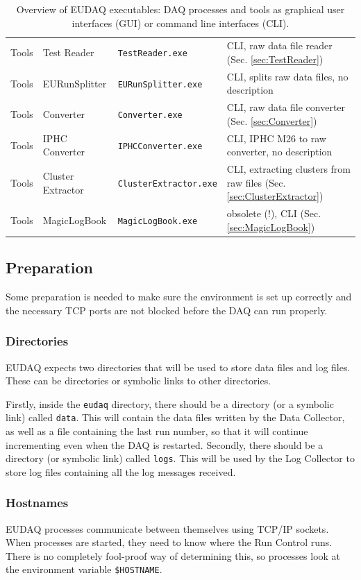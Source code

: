 \begin{table}
\begin{tabular}{ c | l | l | p{4cm}}
  Tools & Test Reader & \texttt{TestReader.exe} & CLI, raw data file reader (Sec. \ref{sec:TestReader}) \\
  Tools & EURunSplitter & \texttt{EURunSplitter.exe} & CLI, splits raw data files, no description \\
  Tools & Converter & \texttt{Converter.exe} & CLI, raw data file converter (Sec. \ref{sec:Converter}) \\
  Tools & IPHC Converter & \texttt{IPHCConverter.exe} & CLI, IPHC M26 to raw converter, no description \\
  Tools & Cluster Extractor & \texttt{ClusterExtractor.exe} & CLI, extracting clusters from raw files  (Sec. \ref{sec:ClusterExtractor}) \\
  Tools & MagicLogBook & \texttt{MagicLogBook.exe} & obsolete (!), CLI  (Sec. \ref{sec:MagicLogBook}) \\
\end{tabular}
\caption{Overview of EUDAQ executables: DAQ processes and tools as graphical user interfaces (GUI) or command line interfaces (CLI).}
\label{tab:exes}
\end{table}

\subsection{Preparation}
Some preparation is needed to make sure the environment is set up correctly and
the necessary TCP ports are not blocked before the DAQ can run properly.

\subsubsection{Directories}
EUDAQ expects two directories that will be used to store data files and log files.
These can be directories or symbolic links to other directories.

Firstly, inside the \texttt{eudaq} directory, there should be a directory (or a symbolic link) called \texttt{data}.
This will contain the data files written by the Data Collector, as well as a file containing the last run number,
so that it will continue incrementing even when the DAQ is restarted. 
Secondly, there should be a directory (or symbolic link) called \texttt{logs}.
This will be used by the Log Collector to store log files containing all the log messages received.

\subsubsection{Hostnames}
EUDAQ processes communicate between themselves using TCP/IP sockets.
When processes are started, they need to know where the Run Control runs.
There is no completely fool-proof way of determining this,
so processes look at the environment variable \texttt{\$HOSTNAME}.

